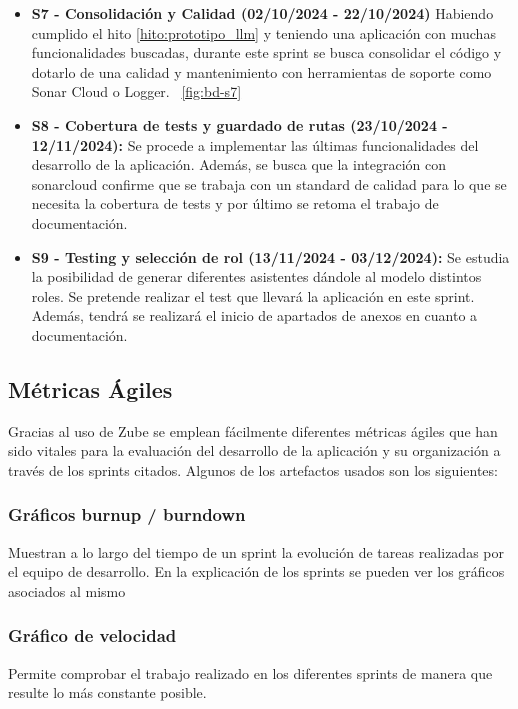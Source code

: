\begin{itemize}
\item \textbf{S7 - Consolidación y Calidad (02/10/2024 - 22/10/2024)} Habiendo cumplido el hito \ref{hito:prototipo_llm} y teniendo una aplicación con muchas funcionalidades buscadas, durante este sprint se busca consolidar el código y dotarlo de una calidad y mantenimiento con herramientas de soporte como Sonar Cloud o Logger.
~\ref{fig:bd-s7}

\item \textbf{S8 - Cobertura de tests y guardado de rutas (23/10/2024 - 12/11/2024):} Se procede a implementar las últimas funcionalidades del desarrollo de la aplicación. Además, se busca que la integración con sonarcloud confirme que se trabaja con un standard de calidad para lo que se necesita la cobertura de tests y por último se retoma el trabajo de documentación. 

\item \textbf{S9 - Testing y selección de rol (13/11/2024 - 03/12/2024):} Se estudia la posibilidad de generar diferentes asistentes dándole al modelo distintos roles. Se pretende realizar el test que llevará la aplicación en este sprint. Además, tendrá se realizará el inicio de apartados de anexos en cuanto a documentación. 

\end{itemize}

\subsection{Métricas Ágiles}
Gracias al uso de Zube se emplean fácilmente diferentes métricas ágiles que han sido vitales para la evaluación del desarrollo de la aplicación y su organización a través de los sprints citados. Algunos de los artefactos usados son los siguientes:
\subsubsection{Gráficos burnup / burndown} 
Muestran a lo largo del tiempo de un sprint la evolución de tareas realizadas por el equipo de desarrollo. En la explicación de los sprints se pueden ver los gráficos asociados al mismo
\subsubsection{Gráfico de velocidad} 
Permite comprobar el trabajo realizado en los diferentes sprints de manera que resulte lo más constante posible.


